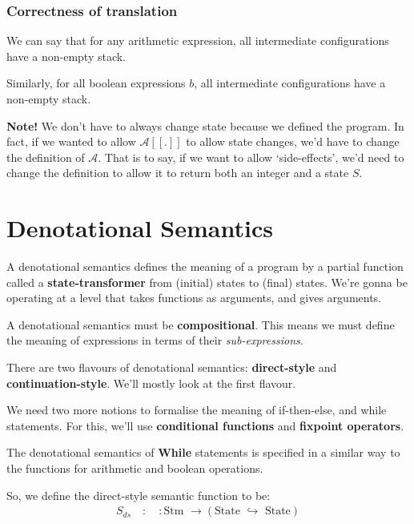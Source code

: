 \documentclass[11pt,a4paper,titlepage,dvipsnames,cmyk]{scrartcl}
\newcommand\pfun{\hookrightarrow}
\begin{document}
\subsubsection{Correctness of translation}%
\label{ssub:correctness-translation}
We can say that for any arithmetic expression, all intermediate
configurations have a non-empty stack. 

Similarly, for all boolean expressions $b$, all intermediate
configurations have a non-empty stack.

\textbf{Note!} We don't have to always change state because we defined the
program. In fact, if we wanted to allow $\mathcal{A}[\![.]\!]$ to allow
state changes, we'd have to change the definition of $\mathcal{A}$. That
is to say, if we want to allow `side-effects', we'd need to change the
definition to allow it to return both an integer and a state $S$.

\section{Denotational Semantics}%
\label{sec:denotational-semantics}
A denotational semantics defines the meaning of a program by a partial
function called a \textbf{state-transformer} from (initial) states to
(final) states. We're gonna be operating at a level that takes functions
as arguments, and gives arguments.

A denotational semantics must be \textbf{compositional}. This means we
must define the meaning of expressions in terms of their
\textit{sub-expressions}.

There are two flavours of denotational semantics: \textbf{direct-style}
and \textbf{continuation-style}. We'll mostly look at the first flavour.

We need two more notions to formalise the meaning of if-then-else, and
while statements. For this, we'll use \textbf{conditional functions} and
\textbf{fixpoint operators}.

The denotational semantics of \textbf{While} statements is specified in a
similar way to the functions for arithmetic and boolean operations.

So, we define the direct-style semantic function to be:
\begin{align*}
    S_{ds} \quad : \quad: \text{Stm } \rightarrow ( \text{State } \pfun
    \text{ State})
\end{align*}
\end{document}
